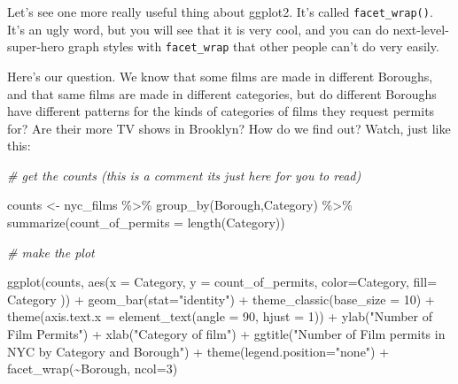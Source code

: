 \documentclass[
]{book}
\newenvironment{Shaded}{\begin{snugshade}}{\end{snugshade}}
\newcommand{\AttributeTok}[1]{\textcolor[rgb]{0.77,0.63,0.00}{#1}}
\newcommand{\CommentTok}[1]{\textcolor[rgb]{0.56,0.35,0.01}{\textit{#1}}}
\newcommand{\DecValTok}[1]{\textcolor[rgb]{0.00,0.00,0.81}{#1}}
\newcommand{\FunctionTok}[1]{\textcolor[rgb]{0.00,0.00,0.00}{#1}}
\newcommand{\NormalTok}[1]{#1}
\newcommand{\OtherTok}[1]{\textcolor[rgb]{0.56,0.35,0.01}{#1}}
\newcommand{\SpecialCharTok}[1]{\textcolor[rgb]{0.00,0.00,0.00}{#1}}
\newcommand{\StringTok}[1]{\textcolor[rgb]{0.31,0.60,0.02}{#1}}
\begin{document}
Let's see one more really useful thing about ggplot2. It's called \texttt{facet\_wrap()}. It's an ugly word, but you will see that it is very cool, and you can do next-level-super-hero graph styles with \texttt{facet\_wrap} that other people can't do very easily.

Here's our question. We know that some films are made in different Boroughs, and that same films are made in different categories, but do different Boroughs have different patterns for the kinds of categories of films they request permits for? Are their more TV shows in Brooklyn? How do we find out? Watch, just like this:

\begin{Shaded}
\begin{Highlighting}[]
\CommentTok{\# get the counts (this is a comment it\textquotesingle{}s just here for you to read)}

\NormalTok{counts }\OtherTok{\textless{}{-}}\NormalTok{ nyc\_films }\SpecialCharTok{\%\textgreater{}\%}
          \FunctionTok{group\_by}\NormalTok{(Borough,Category) }\SpecialCharTok{\%\textgreater{}\%}
          \FunctionTok{summarize}\NormalTok{(}\AttributeTok{count\_of\_permits =} \FunctionTok{length}\NormalTok{(Category))}

\CommentTok{\# make the plot}

\FunctionTok{ggplot}\NormalTok{(counts, }\FunctionTok{aes}\NormalTok{(}\AttributeTok{x =}\NormalTok{ Category, }\AttributeTok{y =}\NormalTok{ count\_of\_permits, }
                   \AttributeTok{color=}\NormalTok{Category, }
                   \AttributeTok{fill=}\NormalTok{ Category )) }\SpecialCharTok{+}
  \FunctionTok{geom\_bar}\NormalTok{(}\AttributeTok{stat=}\StringTok{"identity"}\NormalTok{) }\SpecialCharTok{+} 
  \FunctionTok{theme\_classic}\NormalTok{(}\AttributeTok{base\_size =} \DecValTok{10}\NormalTok{) }\SpecialCharTok{+}
  \FunctionTok{theme}\NormalTok{(}\AttributeTok{axis.text.x =} \FunctionTok{element\_text}\NormalTok{(}\AttributeTok{angle =} \DecValTok{90}\NormalTok{, }\AttributeTok{hjust =} \DecValTok{1}\NormalTok{)) }\SpecialCharTok{+}
  \FunctionTok{ylab}\NormalTok{(}\StringTok{"Number of Film Permits"}\NormalTok{) }\SpecialCharTok{+} 
  \FunctionTok{xlab}\NormalTok{(}\StringTok{"Category of film"}\NormalTok{) }\SpecialCharTok{+}
  \FunctionTok{ggtitle}\NormalTok{(}\StringTok{"Number of Film permits in NYC by Category and Borough"}\NormalTok{) }\SpecialCharTok{+}
  \FunctionTok{theme}\NormalTok{(}\AttributeTok{legend.position=}\StringTok{"none"}\NormalTok{) }\SpecialCharTok{+}
  \FunctionTok{facet\_wrap}\NormalTok{(}\SpecialCharTok{\textasciitilde{}}\NormalTok{Borough, }\AttributeTok{ncol=}\DecValTok{3}\NormalTok{)}
\end{Highlighting}
\end{Shaded}
\end{document}
